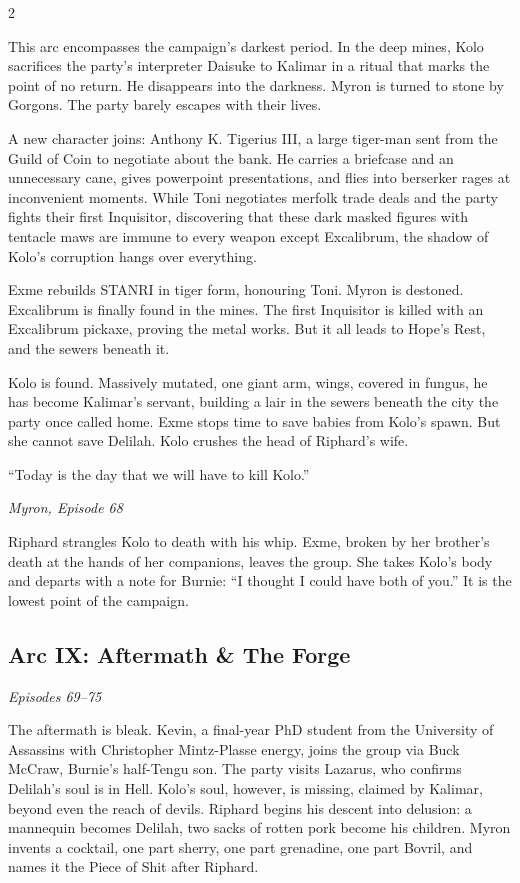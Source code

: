 \begin{multicols}{2}
\medskip

\noindent
This arc encompasses the campaign's darkest period.  In the deep mines, Kolo sacrifices the party's interpreter Daisuke to Kalimar in a ritual that marks the point of no return.  He disappears into the darkness.  Myron is turned to stone by Gorgons.  The party barely escapes with their lives.

A new character joins: Anthony K. Tigerius III, a large tiger-man sent from the Guild of Coin to negotiate about the bank.  He carries a briefcase and an unnecessary cane, gives powerpoint presentations, and flies into berserker rages at inconvenient moments.  While Toni negotiates merfolk trade deals and the party fights their first Inquisitor, discovering that these dark masked figures with tentacle maws are immune to every weapon except Excalibrum, the shadow of Kolo's corruption hangs over everything.

Exme rebuilds STANRI in tiger form, honouring Toni.  Myron is destoned.  Excalibrum is finally found in the mines.  The first Inquisitor is killed with an Excalibrum pickaxe, proving the metal works.  But it all leads to Hope's Rest, and the sewers beneath it.

Kolo is found.  Massively mutated, one giant arm, wings, covered in fungus, he has become Kalimar's servant, building a lair in the sewers beneath the city the party once called home.  Exme stops time to save babies from Kolo's spawn.  But she cannot save Delilah.  Kolo crushes the head of Riphard's wife.

\begin{DndReadAloud}
``Today is the day that we will have to kill Kolo.''

{\itshape\hfill Myron, Episode 68}
\end{DndReadAloud}

Riphard strangles Kolo to death with his whip.  Exme, broken by her brother's death at the hands of her companions, leaves the group.  She takes Kolo's body and departs with a note for Burnie: ``I thought I could have both of you.''  It is the lowest point of the campaign.

\subsection*{Arc IX: Aftermath \& The Forge}
\textit{Episodes 69--75}

\medskip

\noindent
The aftermath is bleak.  Kevin, a final-year PhD student from the University of Assassins with Christopher Mintz-Plasse energy, joins the group via Buck McCraw, Burnie's half-Tengu son.  The party visits Lazarus, who confirms Delilah's soul is in Hell.  Kolo's soul, however, is missing, claimed by Kalimar, beyond even the reach of devils.  Riphard begins his descent into delusion: a mannequin becomes Delilah, two sacks of rotten pork become his children.  Myron invents a cocktail, one part sherry, one part grenadine, one part Bovril, and names it the Piece of Shit after Riphard.


\end{multicols}
